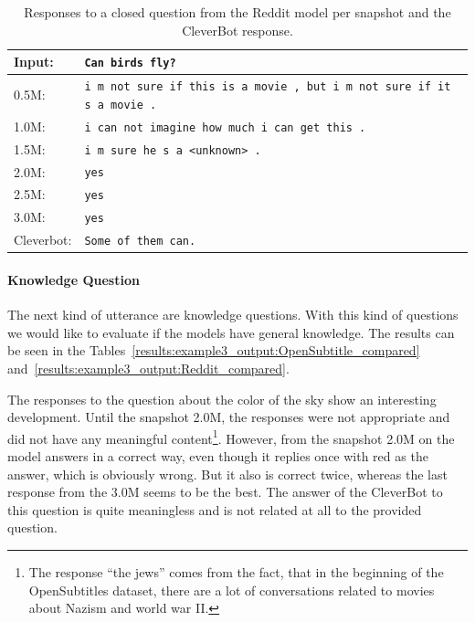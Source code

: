 \begin{table}[H]
	\centering
	\begin{adjustbox}{max width=\textwidth}
		\begin{tabularx}{\textwidth}{lX}
			\toprule
			Input: 	& \texttt{Can birds fly?}\\
			\midrule
			0.5M: 	& \texttt{i m not sure if this is a movie , but i m not sure if it s a movie .}\\
			1.0M: 	& \texttt{i can not imagine how much i can get this .}\\
			1.5M:	& \texttt{i m sure he s a <unknown> .}\\
			2.0M:	& \texttt{yes}\\
			2.5M:	& \texttt{yes}\\
			3.0M:	& \texttt{yes}\\
			Cleverbot:	& \texttt{Some of them can.}\\
			\bottomrule
		\end{tabularx}
	\end{adjustbox}
	\caption{Responses to a closed question from the Reddit model per snapshot and the CleverBot response.}
	\label{results:example2_output:Reddit_compared}
\end{table}

\paragraph{Knowledge Question}
The next kind of utterance are knowledge questions. With this kind of questions we would like to evaluate if the models have general knowledge. The results can be seen in the Tables~\ref{results:example3_output:OpenSubtitle_compared} and~\ref{results:example3_output:Reddit_compared}.

The responses to the question about the color of the sky show an interesting development. Until the snapshot 2.0M, the responses were not appropriate and did not have any meaningful content\footnote{The response ``the jews'' comes from the fact, that in the beginning of the OpenSubtitles dataset, there are a lot of conversations related to movies about Nazism and world war II.}. However, from the snapshot 2.0M on the model answers in a correct way, even though it replies once with red as the answer, which is obviously wrong. But it also is correct twice, whereas the last response from the 3.0M seems to be the best. The answer of the CleverBot to this question is quite meaningless and is not related at all to the provided question.

